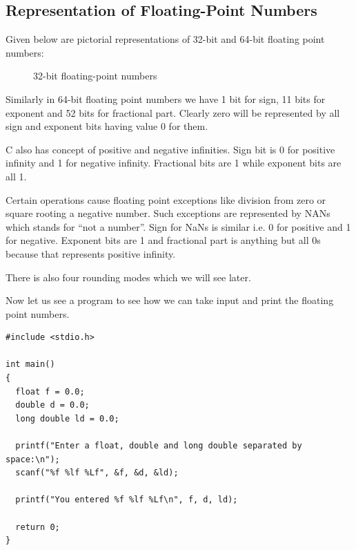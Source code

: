 \subsection{Representation of Floating-Point Numbers}
Given below are pictorial representations of 32-bit and 64-bit floating point
numbers:
\begin{figure}[H]
\begin{center}
\caption{32-bit floating-point numbers}
\label{fig:32-bit floating point numbers}
\end{center}
\end{figure}

Similarly in 64-bit floating point numbers we have 1 bit for sign, 11 bits for
exponent and 52 bits for fractional part. Clearly zero will be represented by
all sign and exponent bits having value 0 for them.

C also has concept of positive and negative infinities. Sign bit is 0 for
positive infinity and 1 for negative infinity. Fractional bits are 1 while
exponent bits are all 1.

Certain operations cause floating point exceptions like division from zero or
square rooting a negative number. Such exceptions are represented by NANs which
stands for ``not a number''. Sign for NaNs is similar i.e. 0 for positive and 1
for negative. Exponent bits are 1 and fractional part is anything but all 0s
because that represents positive infinity.

There is also four rounding modes which we will see later.

Now let us see a program to see how we can take input and print the floating
point numbers.

\begin{Verbatim}[frame=single]
#include <stdio.h>

int main()
{
  float f = 0.0;
  double d = 0.0;
  long double ld = 0.0;

  printf("Enter a float, double and long double separated by space:\n");
  scanf("%f %lf %Lf", &f, &d, &ld);

  printf("You entered %f %lf %Lf\n", f, d, ld);

  return 0;
}
\end{Verbatim}

